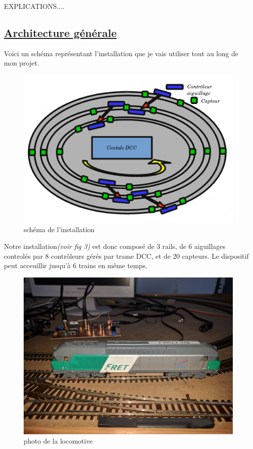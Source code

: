 EXPLICATIONS....

\newpage

\subsection{\underline{ Architecture g\'en\'erale}}
\label{sec:archi}

  Voici un sch\'ema repr\'esentant l'installation que je vais
utiliser tout au long de mon projet.


\begin{figure}[ht]
\centering
\includegraphics[scale=0.30]{schema.png}
\caption{sch\'ema de l'installation}
\label{fig4}
\end{figure}

  Notre installation\emph{(voir fig 3)} est donc compos\'e de 3 rails, de 6 aiguillages
control\'es par 8 contr\^oleurs gérés par trame DCC, et de 20 capteurs.
Le dispositif peut acceuillir jusqu'\`a 6 trains en m\^eme temps.

\begin{figure}[ht]
\centering
\includegraphics[scale=0.05]{loco.jpg}
\caption{photo de la locomotive}
\label{fig5}
\end{figure}

